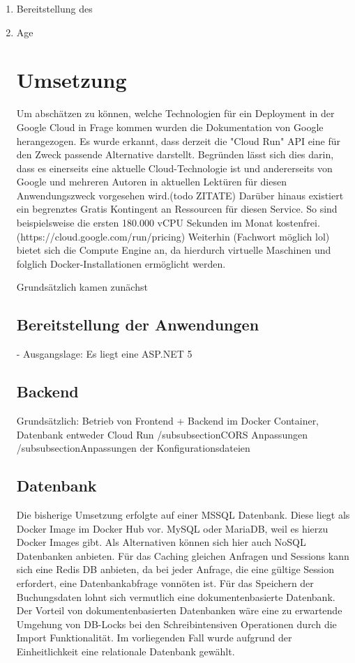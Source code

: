 \documentclass[pdftex,a4paper,abstracton,11pt,parskip=half,bibtotocnumbered]{scrartcl}
\begin{document}
\begin{enumerate}
	\item Bereitstellung des  
	\item Age

\section{Umsetzung}
	Um abschätzen zu können, welche Technologien für ein Deployment in der Google Cloud in Frage kommen wurden die Dokumentation von Google herangezogen.
	Es wurde erkannt, dass derzeit die "Cloud Run" API eine für den Zweck passende Alternative darstellt. Begründen lässt sich dies darin, dass es einerseits 
	eine aktuelle Cloud-Technologie ist und andererseits von Google und mehreren Autoren in aktuellen Lektüren für diesen Anwendungszweck vorgesehen wird.(todo ZITATE)
	Darüber hinaus existiert ein begrenztes Gratis Kontingent an Ressourcen für diesen Service. So sind beispielsweise die ersten 180.000 vCPU Sekunden 
	im Monat kostenfrei. (https://cloud.google.com/run/pricing)
	Weiterhin (Fachwort möglich lol) bietet sich die Compute Engine an, da hierdurch virtuelle Maschinen und folglich Docker-Installationen ermöglicht werden.



	Grundsätzlich kamen zunächst  
	\subsection{Bereitstellung der Anwendungen}
		- Ausgangslage: Es liegt eine ASP.NET 5 

	

	\subsection{Backend}
	Grundsätzlich: Betrieb von Frontend + Backend im Docker Container, Datenbank entweder 
	Cloud Run
	/subsubsection{CORS Anpassungen}
	/subsubsection{Anpassungen der Konfigurationsdateien}
	
	\subsection{Datenbank}
		Die bisherige Umsetzung erfolgte auf einer MSSQL Datenbank. Diese liegt als Docker Image im Docker Hub vor.
		MySQL oder MariaDB, weil es hierzu Docker Images gibt. Als Alternativen können sich hier auch NoSQL Datenbanken anbieten. Für das Caching
		gleichen Anfragen und Sessions kann sich eine Redis DB anbieten, da bei jeder Anfrage, die eine gültige Session erfordert, eine Datenbankabfrage
		vonnöten ist. Für das Speichern der Buchungsdaten lohnt sich vermutlich eine dokumentenbasierte Datenbank. Der Vorteil von dokumentenbasierten 
		Datenbanken wäre eine zu erwartende Umgehung von DB-Locks bei den Schreibintensiven Operationen durch die Import Funktionalität. Im vorliegenden
		Fall wurde aufgrund der Einheitlichkeit eine relationale Datenbank gewählt. 
		

\end{enumerate}
\end{document}
